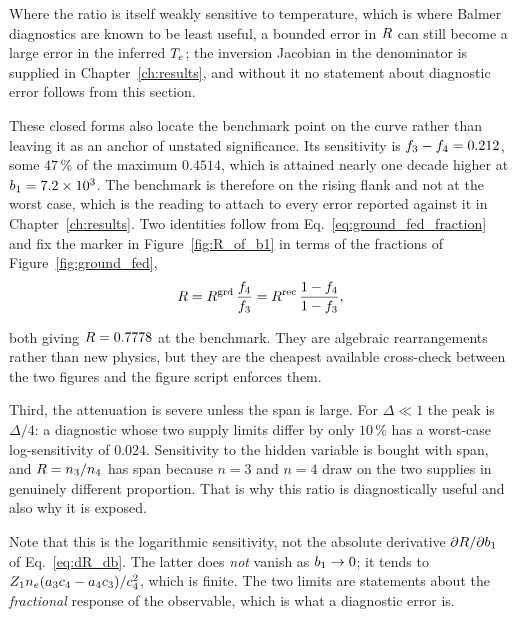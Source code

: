 Where the ratio is itself weakly sensitive to temperature, which is where
Balmer diagnostics are known to be least useful, a bounded error in $R$ can
still become a large error in the inferred $T_e$; the inversion Jacobian in the
denominator is supplied in Chapter~\ref{ch:results}, and without it no
statement about diagnostic error follows from this section.

These closed forms also locate the benchmark point on the curve rather than
leaving it as an anchor of unstated significance. Its sensitivity is
$f_{3}-f_{4} = 0.212$, some $47\,\%$ of the maximum $0.4514$, which is
attained nearly one decade higher at $b_1 = 7.2\times10^{3}$. The benchmark is
therefore on the rising flank and not at the worst case, which is the reading
to attach to every error reported against it in
Chapter~\ref{ch:results}. Two identities follow from
Eq.~\eqref{eq:ground_fed_fraction} and fix the marker in
Figure~\ref{fig:R_of_b1} in terms of the fractions of
Figure~\ref{fig:ground_fed},
\begin{equation}
  R = R^{\rm grd}\,\frac{f_{4}}{f_{3}}
        = R^{\rm rec}\,\frac{1-f_{4}}{1-f_{3}},
  \label{eq:R_from_fractions}
\end{equation}

\noindent both giving $R = 0.7778$ at the benchmark. They are algebraic
rearrangements rather than new physics, but they are the cheapest available
cross-check between the two figures and the figure script enforces them.

Third, the attenuation is severe unless the span is large. For $\Delta \ll 1$
the peak is $\Delta/4$: a diagnostic whose two supply limits differ by only
$10\,\%$ has a worst-case log-sensitivity of $0.024$. Sensitivity to the hidden
variable is bought with span, and $R = n_3/n_4$ has span because $n=3$ and
$n=4$ draw on the two supplies in genuinely different proportion. That is why
this ratio is diagnostically useful and also why it is exposed.

Note that this is the logarithmic sensitivity, not the absolute derivative
$\partial R/\partial b_1$ of Eq.~\eqref{eq:dR_db}. The latter does
\emph{not} vanish as $b_1 \to 0$; it tends to
$Z_{1}n_e(a_3c_4-a_4c_3)/c_4^2$, which is finite. The two limits are
statements about the \emph{fractional} response of the observable, which is what
a diagnostic error is.

